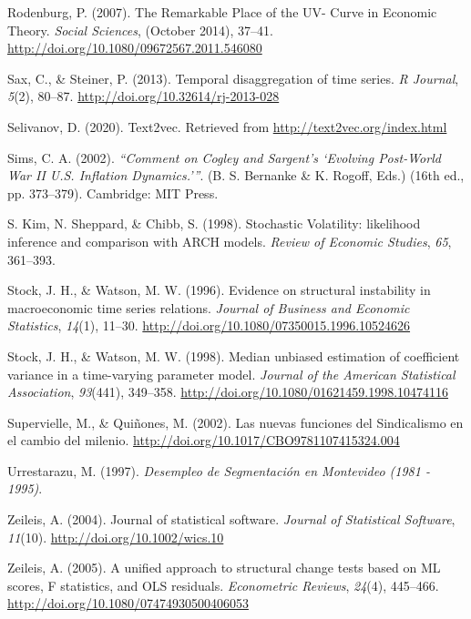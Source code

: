 \documentclass[12pt,oneside]{reedthesis}
\begin{document}
\leavevmode\hypertarget{ref-Rodenburg2007}{}%
Rodenburg, P. (2007). The Remarkable Place of the UV- Curve in Economic Theory. \emph{Social Sciences}, (October 2014), 37--41. \url{http://doi.org/10.1080/09672567.2011.546080}

\leavevmode\hypertarget{ref-Sax2013}{}%
Sax, C., \& Steiner, P. (2013). Temporal disaggregation of time series. \emph{R Journal}, \emph{5}(2), 80--87. \url{http://doi.org/10.32614/rj-2013-028}

\leavevmode\hypertarget{ref-text2vec}{}%
Selivanov, D. (2020). Text2vec. Retrieved from \url{http://text2vec.org/index.html}

\leavevmode\hypertarget{ref-Sims2002}{}%
Sims, C. A. (2002). \emph{``Comment on Cogley and Sargent's `Evolving Post-World War II U.S. Inflation Dynamics.'''}. (B. S. Bernanke \& K. Rogoff, Eds.) (16th ed., pp. 373--379). Cambridge: MIT Press.

\leavevmode\hypertarget{ref-Kim1998}{}%
S. Kim, N. Sheppard, \& Chibb, S. (1998). Stochastic Volatility: likelihood inference and comparison with ARCH models. \emph{Review of Economic Studies}, \emph{65}, 361--393.

\leavevmode\hypertarget{ref-Stock1996}{}%
Stock, J. H., \& Watson, M. W. (1996). Evidence on structural instability in macroeconomic time series relations. \emph{Journal of Business and Economic Statistics}, \emph{14}(1), 11--30. \url{http://doi.org/10.1080/07350015.1996.10524626}

\leavevmode\hypertarget{ref-Stock1998}{}%
Stock, J. H., \& Watson, M. W. (1998). Median unbiased estimation of coefficient variance in a time-varying parameter model. \emph{Journal of the American Statistical Association}, \emph{93}(441), 349--358. \url{http://doi.org/10.1080/01621459.1998.10474116}

\leavevmode\hypertarget{ref-Quinones2001}{}%
Supervielle, M., \& Quiñones, M. (2002). Las nuevas funciones del Sindicalismo en el cambio del milenio. \url{http://doi.org/10.1017/CBO9781107415324.004}

\leavevmode\hypertarget{ref-Urrestarazu1997}{}%
Urrestarazu, M. (1997). \emph{Desempleo de Segmentación en Montevideo (1981 - 1995)}.

\leavevmode\hypertarget{ref-Zeileis2004}{}%
Zeileis, A. (2004). Journal of statistical software. \emph{Journal of Statistical Software}, \emph{11}(10). \url{http://doi.org/10.1002/wics.10}

\leavevmode\hypertarget{ref-Zeileis2005}{}%
Zeileis, A. (2005). A unified approach to structural change tests based on ML scores, F statistics, and OLS residuals. \emph{Econometric Reviews}, \emph{24}(4), 445--466. \url{http://doi.org/10.1080/07474930500406053}
\end{document}
